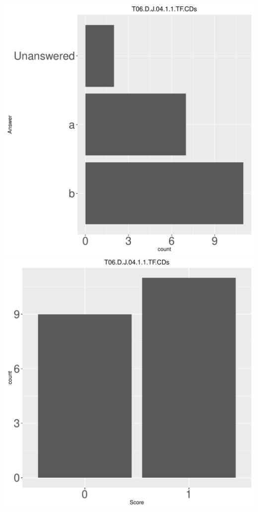 \documentclass[12pt,english,nohyper]{tufte-handout}\usepackage[]{graphicx}\usepackage[]{color}
\begin{document}
\begin{center} \includegraphics[width=.45\linewidth]{Topic06_AB_26_answer} \includegraphics[width=.45\linewidth]{Topic06_AB_26_score} \end{center} 
\end{document}
